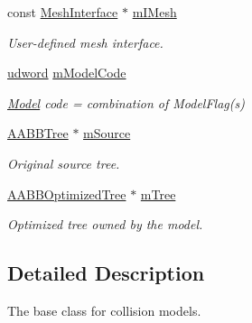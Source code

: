 \begin{DoxyCompactItemize}
\item 
const \hyperlink{classMeshInterface}{Mesh\+Interface} $\ast$ \hyperlink{classBaseModel_abdbd9a2d7c59d2b3161a118a15780a50}{m\+I\+Mesh}\hypertarget{classBaseModel_abdbd9a2d7c59d2b3161a118a15780a50}{}\label{classBaseModel_abdbd9a2d7c59d2b3161a118a15780a50}

\begin{DoxyCompactList}\small\item\em User-\/defined mesh interface. \end{DoxyCompactList}\item 
\hyperlink{IceTypes_8h_a44c6f1920ba5551225fb534f9d1a1733}{udword} \hyperlink{classBaseModel_a93494cf2cdf224e416a095c9a2a44be0}{m\+Model\+Code}\hypertarget{classBaseModel_a93494cf2cdf224e416a095c9a2a44be0}{}\label{classBaseModel_a93494cf2cdf224e416a095c9a2a44be0}

\begin{DoxyCompactList}\small\item\em \hyperlink{classModel}{Model} code = combination of Model\+Flag(s) \end{DoxyCompactList}\item 
\hyperlink{classAABBTree}{A\+A\+B\+B\+Tree} $\ast$ \hyperlink{classBaseModel_a8dba99d0c67cf49ab0ba23f5028ba392}{m\+Source}\hypertarget{classBaseModel_a8dba99d0c67cf49ab0ba23f5028ba392}{}\label{classBaseModel_a8dba99d0c67cf49ab0ba23f5028ba392}

\begin{DoxyCompactList}\small\item\em Original source tree. \end{DoxyCompactList}\item 
\hyperlink{classAABBOptimizedTree}{A\+A\+B\+B\+Optimized\+Tree} $\ast$ \hyperlink{classBaseModel_ab08d18ef9386b3dc40ea2de23ca73b44}{m\+Tree}\hypertarget{classBaseModel_ab08d18ef9386b3dc40ea2de23ca73b44}{}\label{classBaseModel_ab08d18ef9386b3dc40ea2de23ca73b44}

\begin{DoxyCompactList}\small\item\em Optimized tree owned by the model. \end{DoxyCompactList}\end{DoxyCompactItemize}


\subsection{Detailed Description}
The base class for collision models.

